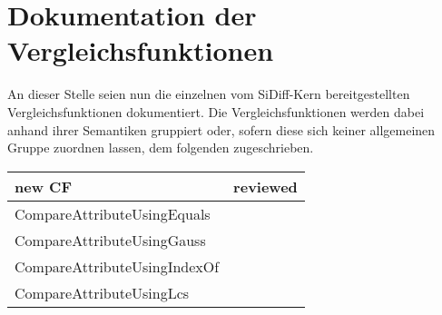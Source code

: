 %
%

\chapter{Dokumentation der Vergleichsfunktionen}
\label{strct:spec}
An dieser Stelle seien nun die einzelnen vom SiDiff-Kern bereitgestellten Vergleichsfunktionen dokumentiert. Die Vergleichsfunktionen werden dabei anhand ihrer Semantiken gruppiert oder, sofern diese sich keiner allgemeinen Gruppe zuordnen lassen, dem folgenden  zugeschrieben.

\begin{tabular}[ht]{|l|l|}
\hline
new CF & reviewed \\
\hline
\hline
CompareAttributeUsingEquals & \\
\hline
CompareAttributeUsingGauss & \\
\hline
CompareAttributeUsingIndexOf & \\
\hline
CompareAttributeUsingLcs & \\
\hline

\end{tabular}


